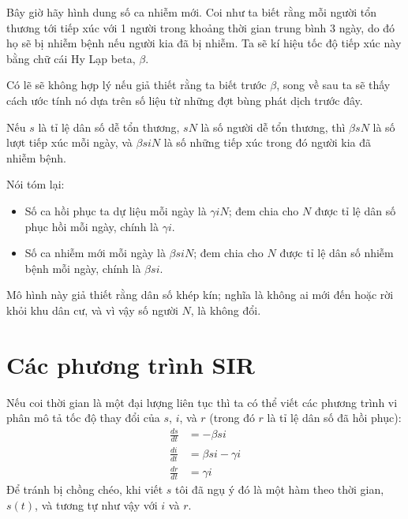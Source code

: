 \documentclass[12pt]{book}
\theoremstyle{exercise}
\begin{document}

Bây giờ hãy hình dung số ca nhiễm mới. Coi như ta biết rằng mỗi người tổn thương tới tiếp xúc với 1 người trong khoảng thời gian trung bình 3 ngày, do đó họ sẽ bị nhiễm  bệnh nếu người kia đã bị nhiễm. Ta sẽ kí hiệu tốc độ tiếp xúc này bằng chữ cái Hy Lạp beta, $\beta$.


Có lẽ sẽ không hợp lý nếu giả thiết rằng ta biết trước $\beta$, song về sau ta sẽ thấy cách ước tính nó dựa trên số liệu từ những đợt bùng phát dịch trước đây.

Nếu $s$ là tỉ lệ dân số dễ tổn thương, $s N$ là số người dễ tổn thương, thì $\beta s N$ là số lượt tiếp xúc mỗi ngày, và $\beta s i N$ là số những tiếp xúc trong đó người kia đã nhiễm bệnh.


Nói tóm lại:

\begin{itemize}

\item Số ca hồi phục ta dự liệu mỗi ngày là $\gamma i N$; đem chia cho $N$ được tỉ lệ dân số phục hồi mỗi ngày, chính là $\gamma i$.

\item Số ca nhiễm mới mỗi ngày là $\beta s i N$; đem chia cho $N$ được tỉ lệ dân số nhiễm bệnh mỗi ngày, chính là $\beta s i$.

\end{itemize}

Mô hình này giả thiết rằng dân số khép kín; nghĩa là không ai mới đến hoặc rời khỏi khu dân cư, và vì vậy số người $N$, là không đổi.


\section{Các phương trình SIR}
\label{sireqn}

Nếu coi thời gian là một đại lượng liên tục thì ta có thể viết các phương trình vi phân mô tả tốc độ thay đổi của $s$, $i$, và $r$ (trong đó $r$ là tỉ lệ dân số đã hồi phục):
%
\begin{align*}
\frac{ds}{dt} &= -\beta s i \\
\frac{di}{dt} &= \beta s i - \gamma i\\
\frac{dr}{dt} &= \gamma i
\end{align*}
%
Để tránh bị chồng chéo, khi viết $s$ tôi đã ngụ ý đó là một hàm theo thời gian, $s(t)$, và tương tự như vậy với $i$ và $r$.
\end{document}
